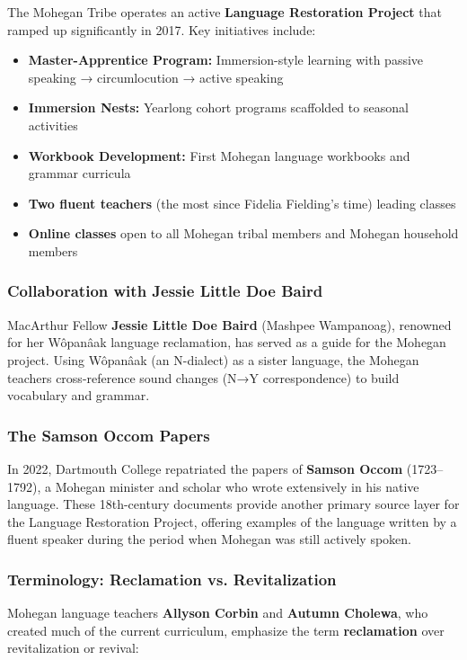 The Mohegan Tribe operates an active \textbf{Language Restoration Project}
that ramped up significantly in 2017. Key initiatives include:
\begin{itemize}
  \item \textbf{Master-Apprentice Program:} Immersion-style learning with
    passive speaking → circumlocution → active speaking
  \item \textbf{Immersion Nests:} Yearlong cohort programs scaffolded to
    seasonal activities
  \item \textbf{Workbook Development:} First Mohegan language workbooks and
    grammar curricula
  \item \textbf{Two fluent teachers} (the most since Fidelia Fielding's time)
    leading classes
  \item \textbf{Online classes} open to all Mohegan tribal members and Mohegan
    household members
\end{itemize}

\subsubsection{Collaboration with Jessie Little Doe Baird}

MacArthur Fellow \textbf{Jessie Little Doe Baird} (Mashpee Wampanoag),
renowned for her Wôpanâak language reclamation, has served as a guide for the
Mohegan project. Using Wôpanâak (an N-dialect) as a sister language, the
Mohegan teachers cross-reference sound changes (N→Y correspondence) to build
vocabulary and grammar.

\subsubsection{The Samson Occom Papers}

In 2022, Dartmouth College repatriated the papers of \textbf{Samson Occom}
(1723--1792), a Mohegan minister and scholar who wrote extensively in his
native language. These 18th-century documents provide another primary source
layer for the Language Restoration Project, offering examples of the language
written by a fluent speaker during the period when Mohegan was still actively
spoken.

\subsubsection{Terminology: Reclamation vs. Revitalization}

Mohegan language teachers \textbf{Allyson Corbin} and \textbf{Autumn Cholewa},
who created much of the current curriculum, emphasize the term
\textbf{reclamation} over revitalization or revival:

